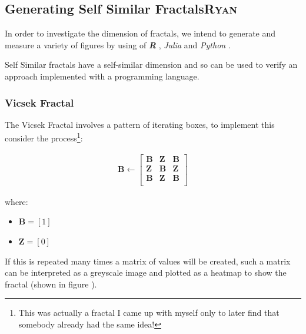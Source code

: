 \documentclass[a4paper,11pt,twoside]{article}
\begin{document}
\subsection{Generating Self Similar Fractals\hfill{}\textsc{Ryan}}
\label{sec:org6692c64}
In order to investigate the dimension of fractals, we intend to generate and measure a variety of figures by using of \textbf{\emph{R}} \cite{rcoreteamLanguageEnvironmentStatistical2020}, \emph{Julia} \cite{bezansonJuliaFreshApproach2017} and \emph{Python} \cite{WelcomePythonOrg}.

Self Similar fractals have a self-similar dimension and so can be used to verify an approach implemented with a programming language.

\subsubsection{Vicsek Fractal}
\label{vicsek-fractal}
The Vicsek Fractal \cite[p. 12]{vicsekFractalGrowthPhenomena1992} involves a pattern of iterating boxes, to implement this consider the process\footnote{This was actually a fractal I came up with myself only to later find that somebody already had the same idea!}:



\begin{align}
\mathbf{B} \leftarrow
   \begin{bmatrix}
       \mathbf{B} & \mathbf{Z} & \mathbf{B} \\
       \mathbf{Z} & \mathbf{B} & \mathbf{Z} \\
       \mathbf{B} & \mathbf{Z} & \mathbf{B} \\
   \end{bmatrix} \label{eq:visek-iter}
\end{align}

where:

\begin{itemize}
\item \(\mathbf{B}= \left[ 1 \right]\)
\item \(\mathbf{Z}= \left[ 0 \right]\)
\end{itemize}


If this is repeated many times a matrix of values will be created, such a matrix
can be interpreted as a greyscale image and plotted as a heatmap to show the
fractal (shown in figure ).
\end{document}
